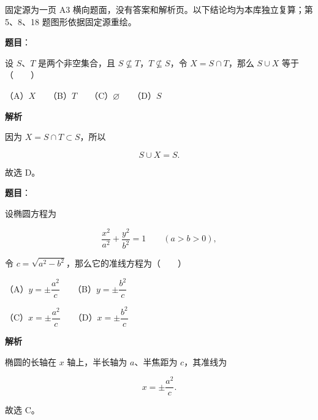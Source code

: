 

\begin{gktip}
固定源为一页 A3 横向题面，没有答案和解析页。以下结论均为本库独立复算；第 5、8、18 题图形依据固定源重绘。
\end{gktip}

\begin{answer}

\textbf{题目}：

设 $S\text{、}T$ 是两个非空集合，且 $S\nsubseteq T$，$T\nsubseteq S$，令 $X=S\cap T$，那么 $S\cup X$ 等于\mbox{（　　）}

（A）$X$　　（B）$T$　　（C）$\varnothing$　　（D）$S$

\textbf{解析}

因为 $X=S\cap T\subset S$，所以

\nopagebreak[4]
\[
S\cup X=S.
\]

故选 D。


\end{answer}
\begin{answer}

\textbf{题目}：

设椭圆方程为

\nopagebreak[4]
\[
\frac{x^2}{a^2}+\frac{y^2}{b^2}=1\qquad(a>b>0),
\]

令 $c=\sqrt{a^2-b^2}$，那么它的准线方程为\mbox{（　　）}

（A）$y=\pm\dfrac{a^2}{c}$　　（B）$y=\pm\dfrac{b^2}{c}$

（C）$x=\pm\dfrac{a^2}{c}$　　（D）$x=\pm\dfrac{b^2}{c}$

\textbf{解析}

椭圆的长轴在 $x$ 轴上，半长轴为 $a$、半焦距为 $c$，其准线为

\nopagebreak[4]
\[
x=\pm\frac{a^2}{c}.
\]

故选 C。


\end{answer}

